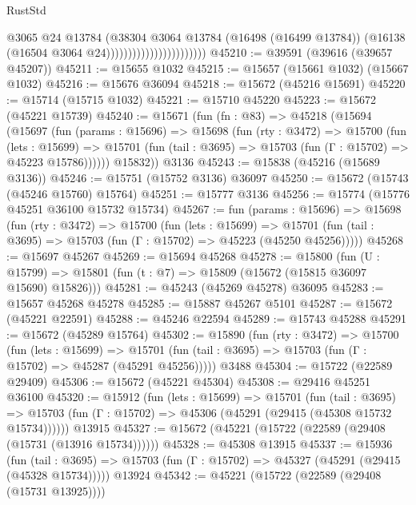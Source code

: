 \begin{lexlean}{RustStd}
\begin{coremodule}
                                            @3065
                                            @24
                                            @13784
                                            (@38304
                                              @3064
                                              @13784
                                              (@16498 (@16499 @13784))
                                              (@16138 (@16504 @3064 @24)))))))))))))))))))))))
@45210 := @39591 (@39616 (@39657 @45207))
@45211 := @15655 @1032
@45215 := @15657 (@15661 @1032) (@15667 @1032)
@45216 := @15676 @36094
@45218 := @15672 (@45216 @15691)
@45220 := @15714 (@15715 @1032)
@45221 := @15710 @45220
@45223 := @15672 (@45221 @15739)
@45240 := @15671
    (fun (fn : @83) =>
    @45218
      (@15694
        (@15697
          (fun (params : @15696) =>
          @15698
            (fun (rty : @3472) =>
            @15700
              (fun (lets : @15699) =>
              @15701 (fun (tail : @3695) => @15703 (fun (Γ : @15702) => @45223 @15786))))))
        @15832))
    @3136
@45243 := @15838 (@45216 (@15689 @3136))
@45246 := @15751 (@15752 @3136) @36097
@45250 := @15672 (@15743 (@45246 @15760) @15764)
@45251 := @15777 @3136
@45256 := @15774 (@15776 @45251 @36100 @15732 @15734)
@45267 := fun (params : @15696) =>
  @15698
    (fun (rty : @3472) =>
    @15700
      (fun (lets : @15699) =>
      @15701 (fun (tail : @3695) => @15703 (fun (Γ : @15702) => @45223 (@45250 @45256)))))
@45268 := @15697 @45267
@45269 := @15694 @45268
@45278 := @15800
    (fun (U : @15799) => @15801 (fun (t : @7) => @15809 (@15672 (@15815 @36097 @15690) @15826)))
@45281 := @45243 (@45269 @45278) @36095
@45283 := @15657 @45268 @45278
@45285 := @15887 @45267 @5101
@45287 := @15672 (@45221 @22591)
@45288 := @45246 @22594
@45289 := @15743 @45288
@45291 := @15672 (@45289 @15764)
@45302 := @15890
    (fun (rty : @3472) =>
    @15700
      (fun (lets : @15699) =>
      @15701 (fun (tail : @3695) => @15703 (fun (Γ : @15702) => @45287 (@45291 @45256)))))
    @3488
@45304 := @15722 (@22589 @29409)
@45306 := @15672 (@45221 @45304)
@45308 := @29416 @45251 @36100
@45320 := @15912
    (fun (lets : @15699) =>
    @15701
      (fun (tail : @3695) =>
      @15703 (fun (Γ : @15702) => @45306 (@45291 (@29415 (@45308 @15732 @15734))))))
    @13915
@45327 := @15672 (@45221 (@15722 (@22589 (@29408 (@15731 (@13916 @15734))))))
@45328 := @45308 @13915
@45337 := @15936
    (fun (tail : @3695) => @15703 (fun (Γ : @15702) => @45327 (@45291 (@29415 (@45328 @15734)))))
    @13924
@45342 := @45221 (@15722 (@22589 (@29408 (@15731 @13925))))

\end{coremodule}
\end{lexlean}
